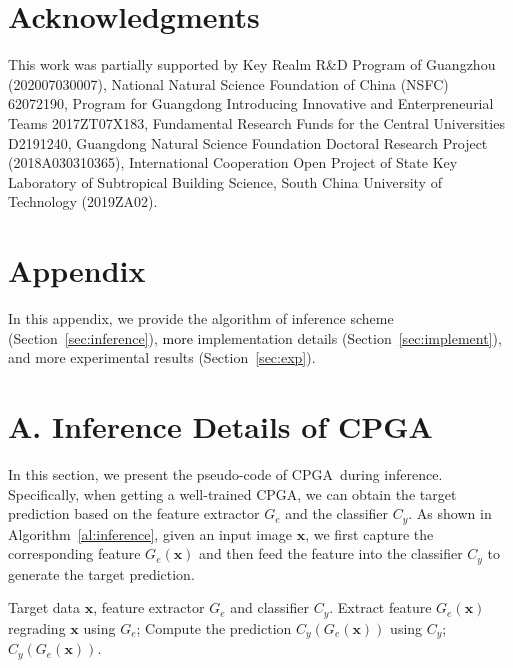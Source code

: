 \documentclass{article}
\def\mata{\textcolor{black}}
\def\ournet{CPGA}
\begin{document}
\section*{Acknowledgments}
This work was partially supported by Key Realm R\&D Program of Guangzhou (202007030007), National Natural Science Foundation of China
(NSFC) 62072190, Program for Guangdong Introducing Innovative and Enterpreneurial Teams 2017ZT07X183, Fundamental Research Funds for the Central Universities D2191240, Guangdong Natural Science Foundation Doctoral Research Project (2018A030310365), International Cooperation Open Project of State Key Laboratory of Subtropical Building Science, South China University of Technology (2019ZA02).


\balance



\newpage


 
\section*{Appendix}
In this appendix, we provide the algorithm of inference scheme (Section~\ref{sec:inference}), \mata{more} implementation details (Section~\ref{sec:implement}), and more experimental results (Section~\ref{sec:exp}).

\section*{A. Inference Details of \ournet} \label{sec:inference}
In this section, we present the pseudo-code of \ournet~during inference. Specifically, when getting a well-trained \ournet, we can obtain the target prediction based on the feature extractor $G_{e}$ and the classifier $C_{y}$.
As shown in Algorithm~\ref{al:inference}, given an input image $\mathbf{x}$, we first capture the corresponding feature $G_{e}(\textbf{x})$ and then feed the feature into the classifier $C_{y}$ to generate the target prediction.


\begin{algorithm}
    \small
    \caption{Inference of \ournet}\label{al:inference}
    \begin{algorithmic}[1]
    \REQUIRE Target data $\textbf{x}$, feature extractor $G_{e}$ and classifier $C_{y}$.
    \STATE Extract feature $G_{e}(\textbf{x})$ regrading $\textbf{x}$ using $G_{e}$;
    \STATE Compute the prediction $C_{y}(G_{e}(\textbf{x}))$ using $C_{y}$;
    \RETURN $C_{y}(G_{e}(\textbf{x}))$.
    \end{algorithmic}
\end{algorithm}
\end{document}
